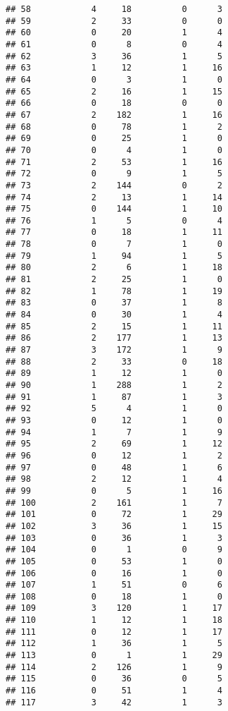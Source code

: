 \documentclass[]{article}
\begin{document}
\begin{verbatim}
## 58            4     18          0      3
## 59            2     33          0      0
## 60            0     20          1      4
## 61            0      8          0      4
## 62            3     36          1      5
## 63            1     12          1     16
## 64            0      3          1      0
## 65            2     16          1     15
## 66            0     18          0      0
## 67            2    182          1     16
## 68            0     78          1      2
## 69            0     25          1      0
## 70            0      4          1      0
## 71            2     53          1     16
## 72            0      9          1      5
## 73            2    144          0      2
## 74            2     13          1     14
## 75            0    144          1     10
## 76            1      5          0      4
## 77            0     18          1     11
## 78            0      7          1      0
## 79            1     94          1      5
## 80            2      6          1     18
## 81            2     25          1      0
## 82            1     78          1     19
## 83            0     37          1      8
## 84            0     30          1      4
## 85            2     15          1     11
## 86            2    177          1     13
## 87            3    172          1      9
## 88            2     33          0     18
## 89            1     12          1      0
## 90            1    288          1      2
## 91            1     87          1      3
## 92            5      4          1      0
## 93            0     12          1      0
## 94            1      7          1      9
## 95            2     69          1     12
## 96            0     12          1      2
## 97            0     48          1      6
## 98            2     12          1      4
## 99            0      5          1     16
## 100           2    161          1      7
## 101           0     72          1     29
## 102           3     36          1     15
## 103           0     36          1      3
## 104           0      1          0      9
## 105           0     53          1      0
## 106           0     16          1      0
## 107           1     51          0      6
## 108           0     18          1      0
## 109           3    120          1     17
## 110           1     12          1     18
## 111           0     12          1     17
## 112           1     36          1      5
## 113           0      1          1     29
## 114           2    126          1      9
## 115           0     36          0      5
## 116           0     51          1      4
## 117           3     42          1      3

\end{verbatim}
\end{document}
